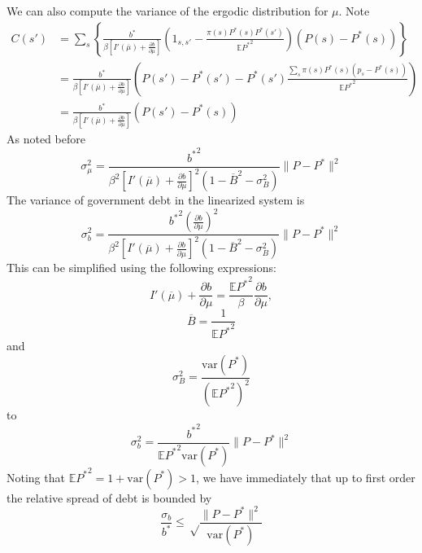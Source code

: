 \documentclass[thmsb,11pt]{article}
\newcommand{\EE}{\mathbb E}
\newcommand{\var}{\mathrm{var}}
\newcommand{\barB}{{\overline B}}
\newcommand{\mubar}{{\overline \mu}}
\begin{document}
We can also compute the variance of the ergodic distribution for $\mu$.  Note
\[
\begin{split}
	C(s') &= \sum_s\left\{\frac{{b^{*}}}{\beta\left[I'(\mubar)+\frac{\partial b}{\partial\mu}\right]}\left(1_{s,s'}-\frac{\pi(s) P^*(s)P^*(s')}{\EE{P^*}^2}\right)(P(s)-P^*(s)) \right\}\\
		 &=\frac{{b^{*}}}{\beta\left[I'(\mubar)+\frac{\partial b}{\partial\mu}\right]}\left( P(s')-P^*(s') -P^*(s')\frac{\sum_s\pi(s)P^*(s)( p_s-P^*(s))}{\EE{P^*}^2}\right)\\
		&= \frac{{b^{*}}}{\beta\left[I'(\mubar)+\frac{\partial b}{\partial\mu}\right]}( P(s')-P^*(s))
\end{split}
\]  As noted before
\[
	\sigma_{\mu}^2 = \frac{{b^{*}}^ 2}{\beta^2\left[I'(\mubar)+\frac{\partial b}{\partial\mu}\right]^2\left(1-\barB^2-\sigma_B^2\right)}\| P-{P^*}\|^2
\]  The variance of government debt in the linearized system is
\[
	\sigma_b^2 = \frac{{b^{*}}^2\left(\frac{\partial b}{\partial\mu}\right)^2}{\beta^2\left[I'(\mubar)+\frac{\partial b}{\partial\mu}\right]^2\left(1-\barB^2-\sigma_B^2\right)}\| P-{P^*}\|^2
\]  This can be simplified using the following expressions:
\[
	I'(\mubar)+\frac{\partial b}{\partial \mu} = \frac{\EE{P^*}^2}{\beta}\frac{\partial b}{\partial\mu},
\]
\[
	\barB = \frac{1}{\EE{P^*}^2}
\]and
\[
	\sigma_B^2 = \frac{\var({P^*})}{(\EE{P^*}^2)^2}
\] to
\begin{equation}
	\sigma^2_b = \frac{{b^{*}}^2}{\EE{P^*}^2\var({P^*})}\|P-{P^*}\|^2
\end{equation}Noting that $\EE{P^*}^2 = 1 +\var({P^*}) > 1$, we have immediately that up to first order the relative spread of debt is bounded by
\begin{equation}
	\frac{\sigma_b}{{b^{*}}} \leq \sqrt\frac{\|P-{P^*}\|^2}{\var({P^*})}
\end{equation}


\newpage





\newpage
\end{document}
